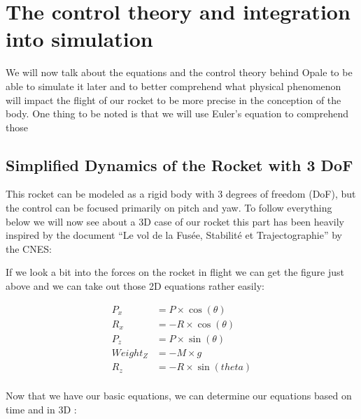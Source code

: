\section{The control theory and integration into simulation}

We will now talk about the equations and the control theory behind Opale to be
able to simulate it later and to better comprehend what physical phenomenon
will impact the flight of our rocket to be more precise in the conception of
the body. One thing to be noted is that we will use Euler’s equation to
comprehend those

\subsection{Simplified Dynamics of the Rocket with 3 DoF}

This rocket can be modeled as a rigid body with 3 degrees of freedom (DoF), but
the control can be focused primarily on pitch and yaw. To follow everything
below we will now see about a 3D case of our rocket this part has been heavily
inspired by the document “Le vol de la Fusée, Stabilité et Trajectographie” by
the CNES:


\FloatBarrier

If we look a bit into the forces on the rocket in flight we can get the figure
just above and we can take out those 2D equations rather easily:

\begin{align*}
    P_x      & = P \times \cos({\theta})   \\
    R_x      & = - R \times \cos({\theta}) \\
    P_z      & = P \times \sin({\theta})   \\
    Weight_Z & = -M \times g               \\
    R_z      & = -R \times \sin ({theta})  \\
\end{align*}
\FloatBarrier

Now that we have our basic equations, we can determine our equations based on
time and in 3D :

